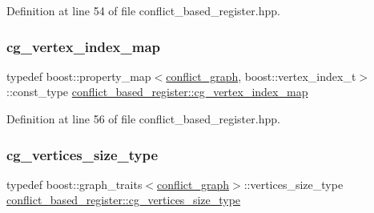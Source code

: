 Definition at line 54 of file conflict\+\_\+based\+\_\+register.\+hpp.

\mbox{\label{classconflict__based__register_a4244cac2851e9a316f0debd0563dd2d2}} 
\subsubsection{\texorpdfstring{cg\+\_\+vertex\+\_\+index\+\_\+map}{cg\_vertex\_index\_map}}
{\footnotesize\ttfamily typedef boost\+::property\+\_\+map$<$\hyperlink{classconflict__based__register_ae3dddabefe4d2f171c7076d0c1c22f05}{conflict\+\_\+graph}, boost\+::vertex\+\_\+index\+\_\+t$>$\+::const\+\_\+type \hyperlink{classconflict__based__register_a4244cac2851e9a316f0debd0563dd2d2}{conflict\+\_\+based\+\_\+register\+::cg\+\_\+vertex\+\_\+index\+\_\+map}\hspace{0.3cm}{\ttfamily [protected]}}



Definition at line 56 of file conflict\+\_\+based\+\_\+register.\+hpp.

\mbox{\label{classconflict__based__register_a7708aaa8ca3c7edc5006102d258ce126}} 
\subsubsection{\texorpdfstring{cg\+\_\+vertices\+\_\+size\+\_\+type}{cg\_vertices\_size\_type}}
{\footnotesize\ttfamily typedef boost\+::graph\+\_\+traits$<$\hyperlink{classconflict__based__register_ae3dddabefe4d2f171c7076d0c1c22f05}{conflict\+\_\+graph}$>$\+::vertices\+\_\+size\+\_\+type \hyperlink{classconflict__based__register_a7708aaa8ca3c7edc5006102d258ce126}{conflict\+\_\+based\+\_\+register\+::cg\+\_\+vertices\+\_\+size\+\_\+type}\hspace{0.3cm}{\ttfamily [protected]}}



